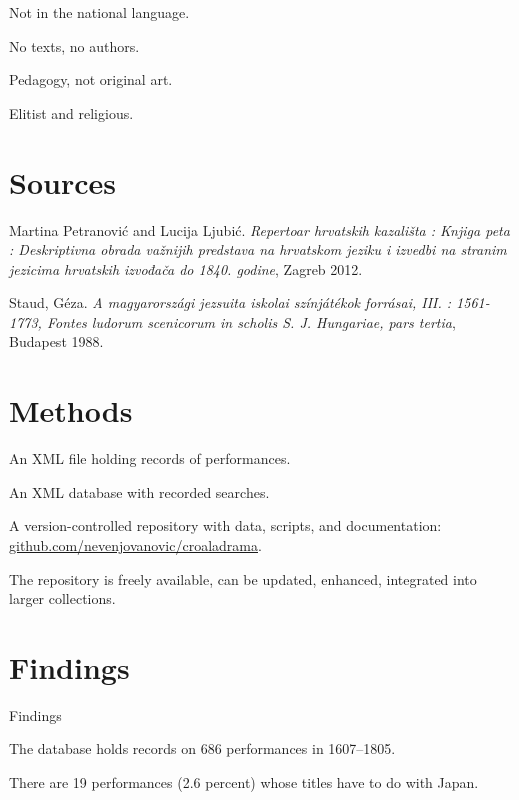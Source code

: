 \documentclass[14pt]{beamer}
\begin{document}
\begin{frame}[standout]

Not in the national language.

No texts, no authors.

Pedagogy, not original art.

Elitist and religious.

\end{frame}

\section{Sources}

\begin{frame}

Martina Petranović and Lucija Ljubić. \emph{Repertoar hrvatskih kazališta : Knjiga peta : Deskriptivna obrada važnijih predstava na hrvatskom jeziku i izvedbi na stranim jezicima hrvatskih izvođača do 1840. godine}, Zagreb 2012.

Staud, Géza. \emph{A magyarországi jezsuita iskolai színjátékok forrásai, III. : 1561-1773, Fontes ludorum scenicorum in scholis S. J. Hungariae, pars tertia}, Budapest 1988.

\end{frame}

\section{Methods}

\begin{frame}

An XML file holding records of performances.

An XML database with recorded searches.

A version-controlled repository with data, scripts, and documentation: \href{https://github.com/nevenjovanovic/croaladrama}{github.com/nevenjovanovic/croaladrama}.

The repository is freely available, can be updated, enhanced, integrated into larger collections.

\end{frame}

\section{Findings}

\begin{frame}{Findings}

The database holds records on \alert{686} performances in 1607–1805.

There are \alert{19} performances (2.6 percent) whose titles have to do with Japan.

\end{frame}
\end{document}
